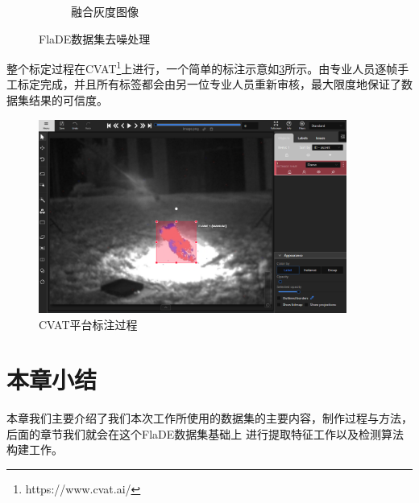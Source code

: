 \begin{figure}[ht]
\begin{subfigure}{0.49\textwidth}
        \caption{融合灰度图像}
        \label{subfig:FlaDE_project_02}
    \end{subfigure}
    \caption{FlaDE数据集去噪处理}
\end{figure}

整个标定过程在CVAT\footnote{https://www.cvat.ai/}上进行，一个简单的标注示意如\ref{fig:annotation}所示。由专业人员逐帧手工标定完成，并且所有标签都会由另一位专业人员重新审核，最大限度地保证了数据集结果的可信度。

\begin{figure}
    \centering
    \includegraphics[width=0.9\textwidth]{figures/annotation.png}
    \caption{CVAT平台标注过程}
    \label{fig:annotation}
\end{figure}

\section{本章小结}
本章我们主要介绍了我们本次工作所使用的数据集的主要内容，制作过程与方法，后面的章节我们就会在这个FlaDE数据集基础上
进行提取特征工作以及检测算法构建工作。
